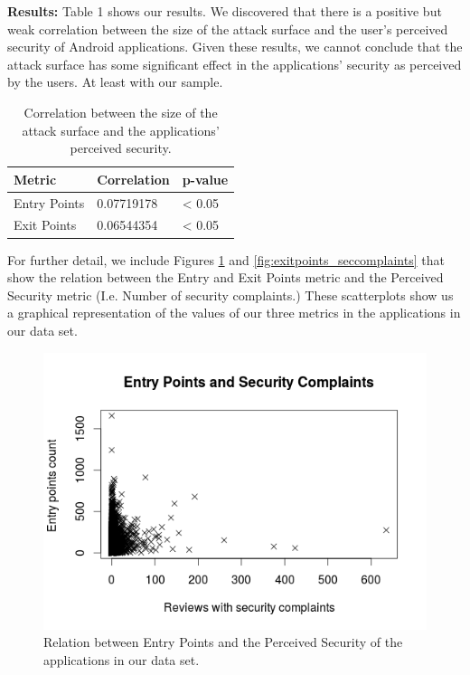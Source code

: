 \documentclass{sig-alternate}
\begin{document}
\textbf{Results:} Table 1 shows our results. We discovered that there is a positive but weak correlation between the size of the attack surface and the user's perceived security of Android applications. Given these results, we cannot conclude that the attack surface has some significant effect in the applications' security as perceived by the users. At least with our sample.

\begin{table}
\centering

\label{tab:result_rq1}

\begin{tabular}{|l|l|l|}
\hline
\textbf{Metric} & \textbf{Correlation} & \textbf{p-value}\\ 
\hline
Entry Points & 0.07719178 & < 0.05 \\
Exit Points & 0.06544354 & < 0.05 \\
\hline
\end{tabular}

\caption{Correlation between the size of the attack surface and the applications' perceived security.}

\end{table}

For further detail, we include Figures \ref{fig:entrypoints_seccomplaints} and \ref{fig:exitpoints_seccomplaints} that show the relation between the Entry and Exit Points metric and the Perceived Security metric (I.e. Number of security complaints.) These scatterplots show us a graphical representation of the values of our three metrics in the applications in our data set.

\begin{figure}
  \centering
  \includegraphics[scale=0.50]{figs/entry_points_sec_complaints.png}
  \caption{Relation between Entry Points and the Perceived Security of the applications in our data set.}
  \label{fig:entrypoints_seccomplaints}
\end{figure}
\end{document}
